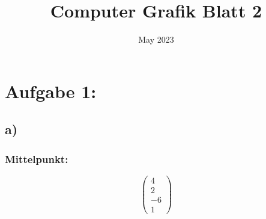 \documentclass{article}
\title{Computer Grafik Blatt 2}
\date{May 2023}
\begin{document}
\maketitle

\section*{Aufgabe 1:}

\subsection*{a)}

\subsubsection*{Mittelpunkt:}
\[
    \begin{pmatrix}
            4 \\
            2 \\
            -6 \\
            1
    \end{pmatrix}
\]
\end{document}
